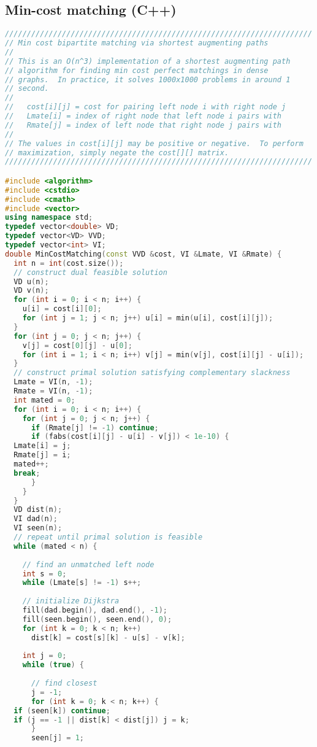 \subsection{Min-cost matching (C++)}
\begin{lstlisting}[language=C++]
//////////////////////////////////////////////////////////////////////
// Min cost bipartite matching via shortest augmenting paths
//
// This is an O(n^3) implementation of a shortest augmenting path
// algorithm for finding min cost perfect matchings in dense
// graphs.  In practice, it solves 1000x1000 problems in around 1
// second.
//
//   cost[i][j] = cost for pairing left node i with right node j
//   Lmate[i] = index of right node that left node i pairs with
//   Rmate[j] = index of left node that right node j pairs with
//
// The values in cost[i][j] may be positive or negative.  To perform
// maximization, simply negate the cost[][] matrix.
//////////////////////////////////////////////////////////////////////

#include <algorithm>
#include <cstdio>
#include <cmath>
#include <vector>
using namespace std;
typedef vector<double> VD;
typedef vector<VD> VVD;
typedef vector<int> VI;
double MinCostMatching(const VVD &cost, VI &Lmate, VI &Rmate) {
  int n = int(cost.size());
  // construct dual feasible solution
  VD u(n);
  VD v(n);
  for (int i = 0; i < n; i++) {
    u[i] = cost[i][0];
    for (int j = 1; j < n; j++) u[i] = min(u[i], cost[i][j]);
  }
  for (int j = 0; j < n; j++) {
    v[j] = cost[0][j] - u[0];
    for (int i = 1; i < n; i++) v[j] = min(v[j], cost[i][j] - u[i]);
  }
  // construct primal solution satisfying complementary slackness
  Lmate = VI(n, -1);
  Rmate = VI(n, -1);
  int mated = 0;
  for (int i = 0; i < n; i++) {
    for (int j = 0; j < n; j++) {
      if (Rmate[j] != -1) continue;
      if (fabs(cost[i][j] - u[i] - v[j]) < 1e-10) {
  Lmate[i] = j;
  Rmate[j] = i;
  mated++;
  break;
      }
    }
  }
  VD dist(n);
  VI dad(n);
  VI seen(n);
  // repeat until primal solution is feasible
  while (mated < n) {
    
    // find an unmatched left node
    int s = 0;
    while (Lmate[s] != -1) s++;
    
    // initialize Dijkstra
    fill(dad.begin(), dad.end(), -1);
    fill(seen.begin(), seen.end(), 0);
    for (int k = 0; k < n; k++) 
      dist[k] = cost[s][k] - u[s] - v[k];
    
    int j = 0;
    while (true) {
      
      // find closest
      j = -1;
      for (int k = 0; k < n; k++) {
  if (seen[k]) continue;
  if (j == -1 || dist[k] < dist[j]) j = k;
      }
      seen[j] = 1;
      

\end{lstlisting}
